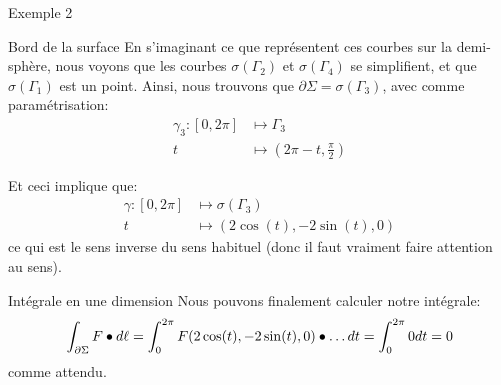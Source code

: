 \documentclass[a4paper]{article}
\begin{document}
\begin{parag}{Exemple 2}
\begin{subparag}{Bord de la surface}
        En s'imaginant ce que représentent ces courbes sur la demi-sphère, nous voyons que les courbes $\sigma\left(\Gamma_2\right)$ et $\sigma\left(\Gamma_4\right)$ se simplifient, et que $\sigma\left(\Gamma_1\right)$ est un point. Ainsi, nous trouvons que $\partial \Sigma = \sigma\left(\Gamma_3\right)$, avec comme paramétrisation: 
        \[\begin{split}
        \gamma_3: \left[0, 2\pi\right] &\longmapsto \Gamma_3 \\
        t &\longmapsto \left(2\pi - t, \frac{\pi}{2}\right)
        \end{split}\]
        
        Et ceci implique que:
        \[\begin{split}
        \gamma: \left[0, 2\pi\right] &\longmapsto \sigma\left(\Gamma_3\right) \\
        t &\longmapsto \left(2\cos\left(t\right), -2\sin\left(t\right), 0\right)
        \end{split}\]
        ce qui est le sens inverse du sens habituel (donc il faut vraiment faire attention au sens).
    \end{subparag}

    \begin{subparag}{Intégrale en une dimension}
        Nous pouvons finalement calculer notre intégrale: 
        \[\int_{\partial \Sigma} F \dotprod d \ell = \int_{0}^{2\pi} F\left(2\cos\left(t\right), -2\sin\left(t\right), 0\right) \dotprod \ldots dt = \int_{0}^{2\pi} 0dt = 0\]
        comme attendu.
    \end{subparag}
\end{parag}
\end{document}
